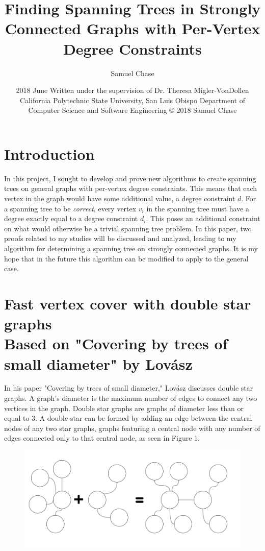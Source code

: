 \documentclass{article}
\title{Finding Spanning Trees in Strongly Connected Graphs with Per-Vertex Degree Constraints}
\author{Samuel Chase}
\date{2018 June \linebreak\linebreak
	\small{Written under the supervision of Dr. Theresa Migler-VonDollen\linebreak\linebreak
	California Polytechnic State University, San Luis Obispo \linebreak\linebreak
	Department of Computer Science and Software Engineering \linebreak\linebreak
	© 2018 Samuel Chase}}
\begin{document}
	\maketitle
	
	\tableofcontents
	\newpage
	\section{Introduction}
	In this project, I sought to develop and prove new algorithms to create spanning trees on general graphs with per-vertex degree constraints. 
	This means that each vertex in the graph would have some additional value, a degree constraint $d$. For a spanning tree to be \textit{correct}, every vertex $v_{i}$ in the spanning tree must have a degree exactly equal to a degree constraint $d_{i}$. This poses an additional constraint on what
	would otherwise be a trivial spanning tree problem. In this paper, two proofs related to my studies will be discussed and analyzed, leading to my algorithm for determining a spanning tree on strongly connected graphs. It is my hope that in the future this algorithm can be modified to apply to the general case.
	
	
	
	\section{Fast vertex cover with double star graphs \\ {\small Based on "Covering by trees of small diameter" by Lov\'asz \cite{1}} }
	In his paper "Covering by trees of small diameter," Lov\'asz discusses double star graphs. A graph's diameter is the maximum number of edges to connect any two vertices in the graph. Double star graphs are graphs of diameter less than or equal to 3. A double star can be formed by adding an edge between the central nodes of any two star graphs, graphs featuring a central node with any number of edges connected only to that central node, as seen in Figure 1.
	\begin{figure}[H]
		\caption{}
		\includegraphics{Figure1}
	\end{figure}
	
\end{document}

